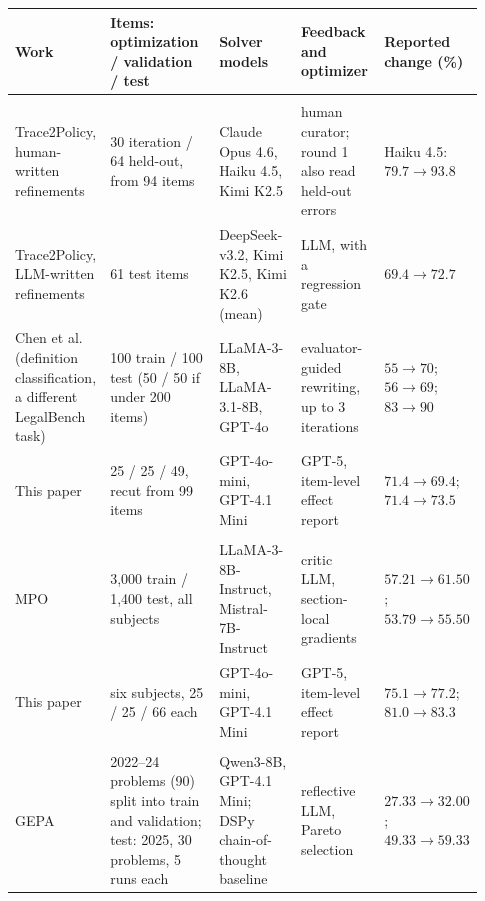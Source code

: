 \documentclass[11pt]{article}
\begin{document}
\begin{table}[htbp]
\centering
\footnotesize
\setlength{\tabcolsep}{3pt}
\begin{tabular}{@{}p{0.18\linewidth}p{0.24\linewidth}p{0.18\linewidth}p{0.18\linewidth}p{0.15\linewidth}@{}}
\toprule
\rowcolor{midblue}Work & Items: optimization / validation / test & Solver models & Feedback and optimizer & Reported change (\%) \\
\midrule
\rowcolor{midgreen}\multicolumn{5}{l}{\textbf{LegalBench-Hearsay}} \\
Trace2Policy, human-written refinements~\citep{zha2026trace2policy} & 30 iteration / 64 held-out, from 94 items & Claude Opus 4.6, Haiku 4.5, Kimi K2.5 & human curator; round 1 also read held-out errors & Haiku 4.5: $79.7\rightarrow 93.8$ \\
Trace2Policy, LLM-written refinements~\citep{zha2026trace2policy} & 61 test items & DeepSeek-v3.2, Kimi K2.5, Kimi K2.6 (mean) & LLM, with a regression gate & $69.4\rightarrow 72.7$ \\
Chen et al.~\citeyearpar{chen2025knowing} (definition classification, a different LegalBench task) & 100 train / 100 test (50 / 50 if under 200 items) & LLaMA-3-8B, LLaMA-3.1-8B, GPT-4o & evaluator-guided rewriting, up to 3 iterations & $55\rightarrow 70$; $56\rightarrow 69$; $83\rightarrow 90$ \\
\rowcolor{softblue}This paper & 25 / 25 / 49, recut from 99 items & GPT-4o-mini, GPT-4.1 Mini & GPT-5, item-level effect report & $71.4\rightarrow 69.4$; $71.4\rightarrow 73.5$ \\
\midrule
\rowcolor{midgreen}\multicolumn{5}{l}{\textbf{MMLU}} \\
MPO~\citep{sharma2026mpo} & 3,000 train / 1,400 test, all subjects & LLaMA-3-8B-Instruct, Mistral-7B-Instruct & critic LLM, section-local gradients & $57.21\rightarrow 61.50$; $53.79\rightarrow 55.50$ \\
\rowcolor{softblue}This paper & six subjects, 25 / 25 / 66 each & GPT-4o-mini, GPT-4.1 Mini & GPT-5, item-level effect report & $75.1\rightarrow 77.2$; $81.0\rightarrow 83.3$ \\
\midrule
\rowcolor{midgreen}\multicolumn{5}{l}{\textbf{AIME}} \\
GEPA~\citep{agrawal2026gepa} & 2022--24 problems (90) split into train and validation; test: 2025, 30 problems, 5 runs each & Qwen3-8B, GPT-4.1 Mini; DSPy chain-of-thought baseline & reflective LLM, Pareto selection & $27.33\rightarrow 32.00$; $49.33\rightarrow 59.33$ \\

\end{tabular}
\end{table}
\end{document}
